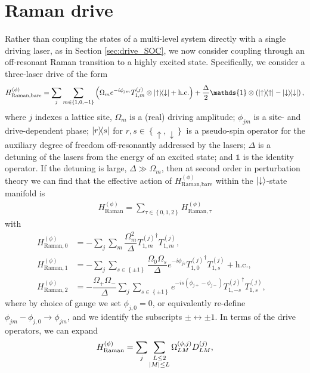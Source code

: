\documentclass[nofootinbib,notitlepage,11pt]{revtex4-2}
\renewcommand{\t}{\text} %
\newcommand{\f}[2]{\dfrac{#1}{#2}} %
\newcommand{\p}[1]{\left(#1\right)} %
\renewcommand{\set}[1]{\left\{#1\right\}} %
\newcommand{\1}{\mathds{1}}
\newcommand{\up}{\uparrow}
\newcommand{\dn}{\downarrow}
\begin{document}
\section{Raman drive}
\label{sec:drive_raman}

Rather than coupling the states of a multi-level system directly with
a single driving laser, as in Section \ref{sec:drive_SOC}, we now
consider coupling through an off-resonant Raman transition to a highly
excited state.  Specifically, we consider a three-laser drive of the
form
\begin{align}
  H_{\t{Raman,bare}}^{(\phi)}
  = \sum_j \sum_{m\in\set{1,0,-1}} \p{\Omega_m e^{-i\phi_{jm}}
    T_{1,m}^{(j)} \otimes \op{\up}{\dn} + \t{h.c.}}
  + \f{\Delta}{2} \1 \otimes \p{\op{\up} - \op{\dn}},
  \label{eq:raman_bare}
\end{align}
where $j$ indexes a lattice site, $\Omega_m$ is a (real) driving
amplitude; $\phi_{jm}$ is a site- and drive-dependent phase;
$\op{r}{s}$ for $r,s\in\set{\up,\dn}$ is a pseudo-spin operator for
the auxiliary degree of freedom off-resonantly addressed by the
lasers; $\Delta$ is a detuning of the lasers from the energy of an
excited state; and $\1$ is the identity operator.  If the detuning is
large, $\Delta\gg\Omega_m$, then at second order in perturbation
theory we can find that the effective action of
$H_{\t{Raman,bare}}^{(\phi)}$ within the $\ket{\dn}$-state manifold is
\begin{align}
  H_{\t{Raman}}^{(\phi)}
  = \sum_{\tau\in\set{0,1,2}} H_{\t{Raman},\tau}^{(\phi)}
\end{align}
with
\begin{align}
  H_{\t{Raman},0}^{(\phi)}
  &= -\sum_j\sum_m \f{\Omega_m^2}{\Delta}
  {T_{1,m}^{(j)}}^\dag T_{1,m}^{(j)}, & \label{eq:raman_0} \\
  H_{\t{Raman},1}^{(\phi)}
  &= -\sum_j\sum_{s\in\set{\pm1}}
  \f{\Omega_0\Omega_s}{\Delta} e^{-i\phi_{js}}
  {T_{1,0}^{(j)}}^\dag T_{1,s}^{(j)} + \t{h.c.},
  \\
  H_{\t{Raman},2}^{(\phi)}
  &= -\f{\Omega_+\Omega_-}{\Delta}
  \sum_j\sum_{s\in\set{\pm1}} e^{-is\p{\phi_{j+}-\phi_{j-}}}
  {T_{1,-s}^{(j)}}^\dag T_{1,s}^{(j)},
  \label{eq:raman_2}
\end{align}
where by choice of gauge we set $\phi_{j,0}=0$, or equivalently
re-define $\phi_{jm}-\phi_{j,0}\to\phi_{jm}$, and we identify the
subscripts $\pm\leftrightarrow\pm1$.  In terms of the drive operators,
we can expand
\begin{align}
  H_{\t{Raman}}^{(\phi)}
  = \sum_j \sum_{\substack{L\le2\\\abs{M}\le L}}
  \Omega_{LM}^{(\phi,j)} D_{LM}^{(j)},
  \label{eq:raman_drive}
\end{align}
\end{document}
